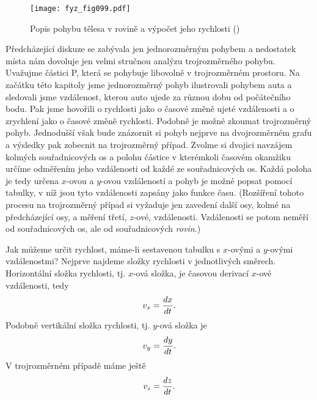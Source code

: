     \begin{figure}[ht!]  %
      \centering
      \texttt{[image: fyz\_fig099.pdf]}
      \caption{Popis pohybu tělesa v rovině a výpočet jeho rychlosti
               (\cite[s.~118]{Feynman01})}
      \label{fyz:fig099}
    \end{figure}
    Předcházející diskuze se zabývala jen jednorozměrným pohybem a nedostatek místa nám dovoluje 
    jen velmi stručnou analýzu trojrozměrného pohybu. Uvažujme částici P, která se pohybuje 
    libovolně v trojrozměrném prostoru. Na začátku této kapitoly jsme jednorozměrný pohyb 
    ilustrovali pohybem auta a sledovali jsme vzdálenost, kterou auto ujede za různou dobu od 
    počátečního bodu. Pak jsme hovořili o rychlosti jako o časové změně ujeté vzdálenosti a o 
    zrychlení jako o časové změně rychlosti. Podobně je možné zkoumat trojrozměrný pohyb. 
    Jednodušší však bude znázornit si pohyb nejprve na dvojrozměrném grafu a výsledky pak zobecnit 
    na trojrozměrný případ. Zvolme si dvojici navzájem kolmých souřadnicových os a polohu částice v 
    kterémkoli časovém okamžiku určíme odměřením jeho vzdálenosti od každé ze souřadnicových os. 
    Každá poloha je tedy určena \(x\)-ovou a \(y\)-ovou vzdáleností a pohyb je možné popsat pomocí 
    tabulky, v níž jsou tyto vzdálenosti zapsány jako funkce času. (Rozšíření tohoto procesu na 
    trojrozměrný případ si vyžaduje jen zavedení další osy, kolmé na předcházející osy, a měření 
    třetí, \(z\)-ové, vzdálenosti. Vzdálenosti se potom neměří od souřadnicových os, ale od 
    souřadnicových \emph{rovin}.)
    
    Jak můžeme určit rychlost, máme-li sestavenou tabulku s \(x\)-ovými a \(y\)-ovými vzdálenostmi? 
    Nejprve najdeme složky rychlosti v jednotlivých směrech. Horizontální složka rychlosti, tj. 
    \(x\)-ová složka, je časovou derivací \(x\)-ové vzdálenosti, tedy
    \begin{equation}\label{FYZ:eq106}
      v_x = \dfrac{d x}{d t}.
    \end{equation}
    Podobně vertikální složka rychlosti, tj. \(y\)-ová složka je
    \begin{equation}\label{FYZ:eq108}
      v_y = \dfrac{d y}{d t}.
    \end{equation}
    V trojrozměrném případě máme ještě
    \begin{equation}\label{FYZ:eq107}
      v_z = \dfrac{d z}{d t}.
    \end{equation}
    
